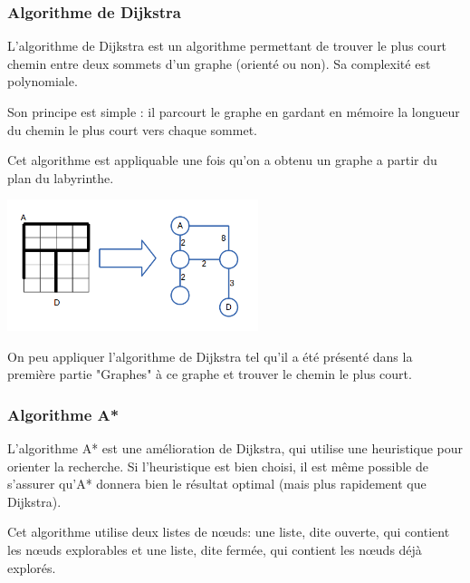   \subsubsection{Algorithme de Dijkstra}
    L'algorithme de Dijkstra est un algorithme permettant de trouver le plus
    court chemin entre deux sommets d'un graphe (orienté ou non). Sa complexité
    est polynomiale.

    Son principe est simple : il parcourt le graphe en gardant en mémoire la
    longueur du chemin le plus court vers chaque sommet.

    Cet algorithme est appliquable une fois qu'on a obtenu un graphe a partir du plan du labyrinthe.

    \begin{center}
      \includegraphics[width=0.55\textwidth]{../slides/jeux/GRO_graph1.png}
    \end{center}

    On peu appliquer l'algorithme de Dijkstra tel qu'il a été présenté dans la
    première partie "Graphes" à ce graphe et trouver le chemin le plus court.

  \subsubsection{Algorithme A*}
    L'algorithme A* est une amélioration de Dijkstra, qui utilise une heuristique
    pour orienter la recherche.
    Si l'heuristique est bien choisi, il est même possible de s'assurer qu'A*
    donnera bien le résultat optimal (mais plus rapidement que Dijkstra).

    Cet algorithme utilise deux listes de nœuds: une liste, dite ouverte, qui
    contient les nœuds explorables et une liste, dite fermée, qui contient les
    nœuds déjà explorés.

